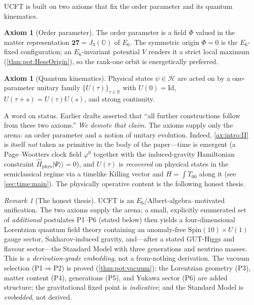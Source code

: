 \documentclass[11pt]{article}
\theoremstyle{plain}
\theoremstyle{definition}
\newtheorem{axiom}[theorem]{Axiom}
\theoremstyle{remark}
\newtheorem{remark}[theorem]{Remark}
\begin{document}
UCFT is built on two axioms that fix the order parameter and its quantum
kinematics.

\begin{axiom}[Order parameter]\label{ax:intro:I}
The order parameter is a field $\Phi$ valued in the matter representation
$\mathbf{27}=J_3(\mathbb{O})$ of $E_6$. The symmetric origin $\Phi=0$ is the
$E_6$-fixed configuration; an $E_6$-invariant potential $V$ renders it a strict
local maximum (\autoref{thm:pot:HessOrigin}), so the rank-one orbit is
energetically preferred.
\end{axiom}

\begin{axiom}[Quantum kinematics]\label{ax:intro:II}
Physical states $\psi\in\mathcal{H}$ are acted on by a one-parameter unitary
family $\{U(\tau)\}_{\tau\in\mathbb{R}}$ with $U(0)=\mathrm{Id}$,
$U(\tau+s)=U(\tau)U(s)$, and strong continuity.
\end{axiom}

A word on status. Earlier drafts asserted that ``all further
constructions follow from these two axioms.'' \emph{We demote that claim.} The
axioms supply only the arena: an order parameter and a notion of unitary
evolution. Indeed, \autoref{ax:intro:II} is itself \emph{not} taken as
primitive in the body of the paper---time is emergent (a Page--Wootters clock
field $\varphi^{0}$ together with the induced-gravity Hamiltonian constraint
$\hat{H}_{\mathrm{phys}}\lvert\Psi\rangle\!\rangle=0$), and $U(\tau)$ is
\emph{recovered} on physical states in the semiclassical regime via a timelike
Killing vector and $H=\int T_{00}$ along it (see \autoref{sec:time:main}). The
physically operative content is the following honest thesis.

\begin{remark}[The honest thesis]\label{rem:intro:thesis}
UCFT is an $E_6$/Albert-algebra--motivated unification. The two axioms supply
the arena; a small, explicitly enumerated set of \emph{additional} postulates
\textnormal{P1--P6} (stated below) then yields a four-dimensional Lorentzian
quantum field theory containing an anomaly-free $\mathrm{Spin}(10)\times U(1)$
gauge sector, Sakharov-induced gravity, and---after a stated GUT-Higgs and
flavour sector---the Standard Model with three generations and neutrino masses.
This is a \emph{derivation-grade embedding}, not a from-nothing derivation. The
vacuum selection \textnormal{(P1$\Rightarrow$P2)} is proved
\textnormal{(\autoref{thm:pot:vacuum})}; the Lorentzian geometry
\textnormal{(P3)}, matter content \textnormal{(P4)}, generations
\textnormal{(P5)}, and Yukawa sector \textnormal{(P6)} are added structure; the
gravitational fixed point is \emph{indicative}; and the Standard Model is
\emph{embedded}, not derived.
\end{remark}
\end{document}
